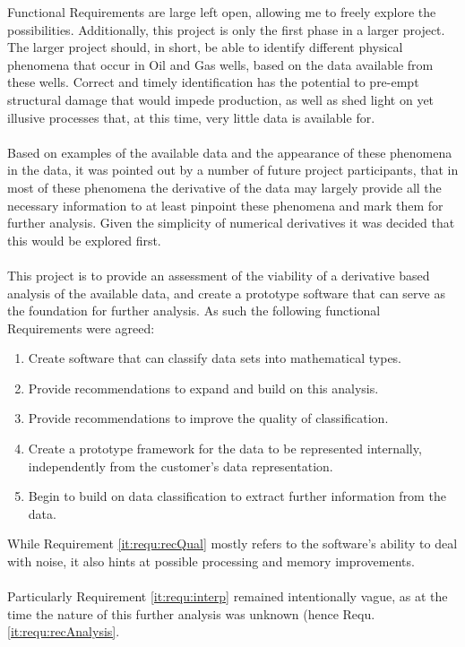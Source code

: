 \documentclass[main.tex]{subfiles}
\begin{document}
      Functional Requirements are large left open, allowing me to freely explore the possibilities. Additionally, this project is only the first phase in a larger project. The larger project should, in short, be able to identify different physical phenomena that occur in Oil and Gas wells, based on the data available from these wells. Correct and timely identification has the potential to pre-empt structural damage that would impede production, as well as shed light on yet illusive processes that, at this time, very little data is available for.
      \\\\
      Based on examples of the available data and the appearance of these phenomena in the data, it was pointed out by a number of future project participants, that in most of these phenomena the derivative of the data may largely provide all the necessary information to at least pinpoint these phenomena and mark them for further analysis. Given the simplicity of numerical derivatives it was decided that this would be explored first.
      \\\\ 
      This project is to provide an assessment of the viability of a derivative based analysis of the available data, and create a prototype software that can serve as the foundation for further analysis. As such the following functional Requirements were agreed:
      
      \begin{enumerate}
        \item \label{it:requ:classify} Create software that can classify data sets into mathematical types.
        \item \label{it:requ:recAnalysis} Provide recommendations to expand and build on this analysis.
        \item \label{it:requ:recQual} Provide recommendations to improve the quality of classification.
        \item \label{it:requ:data} Create a prototype framework for the data to be represented internally, independently from the customer's data representation.
        \item  \label{it:requ:interp} Begin to build on data classification to extract further information from the data.
      \end{enumerate}
      
      While Requirement \ref{it:requ:recQual} mostly refers to the software's ability to deal with noise, it also hints at possible processing and memory improvements.
      \\\\
      Particularly Requirement \ref{it:requ:interp} remained intentionally vague, as at the time the nature of this further analysis was unknown (hence Requ. \ref{it:requ:recAnalysis}.
      
\end{document}
